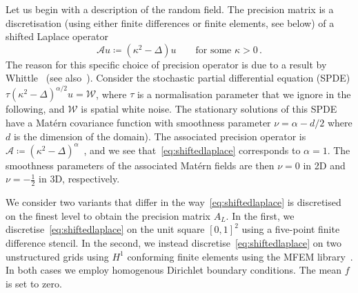 \documentclass[
fontsize=11pt,
paper=a4,
numbers=noenddot
]{scrartcl}
\begin{document}
Let us begin with a description of the random field. The precision matrix is a discretisation (using either finite differences or finite elements, see below) of a shifted Laplace operator
\begin{equation}
    \label{eq:shiftedlaplace}
    \mathcal{A} u \coloneqq (\kappa^2 - \Delta) u \qquad \text{for some } \kappa > 0 \,.
\end{equation}
The reason for this specific choice of precision operator is due to a result by Whittle~\cite{whittle1954,whittle1963} (see also~\cite{lindgren,lindgrenSPDEApproachGaussian2022}). Consider the stochastic partial differential equation (SPDE) $\tau (\kappa^2 - \Delta)^{\alpha/2} u = \mathcal{W}$, where $\tau$ is a normalisation parameter that we ignore in the following, and $\mathcal{W}$ is spatial white noise. The stationary solutions of this SPDE have a Mat\'ern covariance function with smoothness parameter $\nu = \alpha - d/2$ where $d$ is the dimension of the domain). The associated precision operator is $\mathcal{A} \coloneqq {(\kappa^2 - \Delta)}^\alpha$~\cite[Sec.\ 2.2]{lindgrenSPDEApproachGaussian2022}, and we see that~\eqref{eq:shiftedlaplace} corresponds to $\alpha = 1$. The smoothness parameters of the associated Mat\'ern fields are then $\nu = 0$ in 2D and $\nu = -\frac{1}{2}$ in 3D, respectively.

We consider two variants that differ in the way~\eqref{eq:shiftedlaplace} is discretised on the finest level to obtain the precision matrix $A_L$. In the first, we discretise~\eqref{eq:shiftedlaplace} on the unit square ${[0,1]}^2$ using a five-point finite difference stencil. In the second, we instead discretise~\eqref{eq:shiftedlaplace} on two unstructured grids using $H^1$ conforming finite elements using the MFEM library~\cite{mfem,mfem-web}. In both cases we employ homogenous Dirichlet boundary conditions. The mean $f$ is set to zero.

\end{document}
